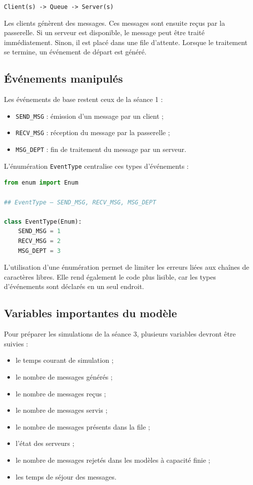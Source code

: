 \documentclass{article}
\begin{document}
\begin{center}
\texttt{Client(s) ->  Queue -> Server(s)}
\end{center}

Les clients génèrent des messages. Ces messages sont ensuite reçus par la passerelle. Si un serveur est disponible, le message peut être traité immédiatement. Sinon, il est placé dans une file d’attente. Lorsque le traitement se termine, un événement de départ est généré.

\subsection{Événements manipulés}

Les événements de base restent ceux de la séance 1 :
\begin{itemize}[leftmargin=*]
    \item \texttt{SEND\_MSG} : émission d’un message par un client ;
    \item \texttt{RECV\_MSG} : réception du message par la passerelle ;
    \item \texttt{MSG\_DEPT} : fin de traitement du message par un serveur.
\end{itemize}

L’énumération \texttt{EventType} centralise ces types d’événements :

\begin{lstlisting}[language=Python, caption=EventType.py]
from enum import Enum

## EventType – SEND_MSG, RECV_MSG, MSG_DEPT

class EventType(Enum):
    SEND_MSG = 1
    RECV_MSG = 2
    MSG_DEPT = 3
\end{lstlisting}

L’utilisation d’une énumération permet de limiter les erreurs liées aux chaînes de caractères libres. Elle rend également le code plus lisible, car les types d’événements sont déclarés en un seul endroit.

\subsection{Variables importantes du modèle}

Pour préparer les simulations de la séance 3, plusieurs variables devront être suivies :
\begin{itemize}[leftmargin=*]
    \item le temps courant de simulation ;
    \item le nombre de messages générés ;
    \item le nombre de messages reçus ;
    \item le nombre de messages servis ;
    \item le nombre de messages présents dans la file ;
    \item l’état des serveurs ;
    \item le nombre de messages rejetés dans les modèles à capacité finie ;
    \item les temps de séjour des messages.
\end{itemize}
\end{document}
